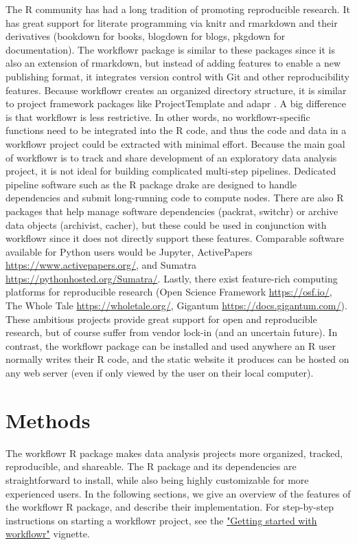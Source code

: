 \documentclass[9pt,a4paper]{extarticle}
\begin{document}
The R community has had a long tradition of promoting reproducible
research. It has great support for literate programming via knitr and
rmarkdown and their derivatives (bookdown for books, blogdown for blogs,
pkgdown for documentation). The workflowr package is similar to these
packages since it is also an extension of rmarkdown, but instead of
adding features to enable a new publishing format, it integrates version
control with Git and other reproducibility features. Because workflowr
creates an organized directory structure, it is similar to project
framework packages like ProjectTemplate and adapr \cite{Gelfond2018}. A
big difference is that workflowr is less restrictive. In other words, no
workflowr-specific functions need to be integrated into the R code, and
thus the code and data in a workflowr project could be extracted with
minimal effort. Because the main goal of workflowr is to track and share
development of an exploratory data analysis project, it is not ideal for
building complicated multi-step pipelines. Dedicated pipeline software
such as the R package drake are designed to handle dependencies and
submit long-running code to compute nodes. There are also R packages
that help manage software dependencies (packrat, switchr) or archive
data objects (archivist, cacher), but these could be used in conjunction
with workflowr since it does not directly support these features.
Comparable software available for Python users would be Jupyter,
ActivePapers \url{https://www.activepapers.org/}, and Sumatra
\url{https://pythonhosted.org/Sumatra/}. Lastly, there exist
feature-rich computing platforms for reproducible research (Open Science
Framework \url{https://osf.io/}, The Whole Tale
\url{https://wholetale.org/}, Gigantum
\url{https://docs.gigantum.com/}). These ambitious projects provide
great support for open and reproducible research, but of course suffer
from vendor lock-in (and an uncertain future). In contrast, the
workflowr package can be installed and used anywhere an R user normally
writes their R code, and the static website it produces can be hosted on
any web server (even if only viewed by the user on their local
computer).


\section*{Methods}

The workflowr R package makes data analysis projects more organized,
tracked, reproducible, and shareable. The R package and its dependencies
are straightforward to install, while also being highly customizable for
more experienced users. In the following sections, we give an overview
of the features of the workflowr R package, and describe their
implementation. For step-by-step instructions on starting a workflowr
project, see the
\href{https://jdblischak.github.io/workflowr/articles/wflow-01-getting-started.html}{"Getting
started with workflowr"} vignette.
\end{document}

